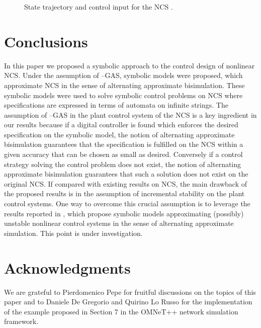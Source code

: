 \documentclass{amsart}
\begin{document}
\begin{figure}[ht]
\begin{center}
\caption{State trajectory and control input for the NCS .} 
\label{fig:sim2}
\end{center}
\end{figure}

\section{Conclusions}\label{sec:conclusion}
In this paper we proposed a symbolic approach to the control design of nonlinear NCS. Under the assumption of --GAS, symbolic models were proposed, which approximate NCS in the sense of alternating approximate bisimulation. These symbolic models were used to solve symbolic control problems on NCS where specifications are expressed in terms of automata on infinite strings. The assumption of --GAS in the plant control system of the NCS is a key ingredient in our results because if a digital controller is found which enforces the desired specification on the symbolic model, the notion of alternating approximate bisimulation guarantees that the specification is fulfilled on the NCS within a given accuracy that can be chosen as small as desired. Conversely if a control strategy solving the control problem does not exist, the notion of alternating approximate bisimulation guarantees that such a solution does not exist on the original NCS. If compared with existing results on NCS, the main drawback of the proposed results is in the assumption of incremental stability on the plant control systems. 
One way to overcome this crucial assumption is to leverage the results reported in \cite{MajidTAC11}, which propose symbolic models approximating (possibly) unstable nonlinear control systems in the sense of alternating approximate simulation. This point is under investigation.

\section*{Acknowledgments}
We are grateful to Pierdomenico Pepe for fruitful discussions on the topics of this paper and to
Daniele De Gregorio and Quirino Lo Russo for the implementation of the example proposed in Section 7 in the OMNeT++  network simulation framework.


  
\end{document}
